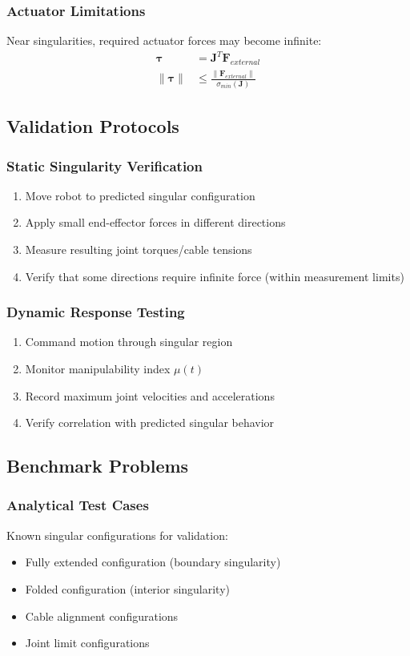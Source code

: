 \documentclass[11pt,a4paper]{article}
\begin{document}
\subsubsection{Actuator Limitations}
Near singularities, required actuator forces may become infinite:
\begin{align}
\bm{\tau} &= \bm{J}^T \bm{F}_{external} \\
\|\bm{\tau}\| &\leq \frac{\|\bm{F}_{external}\|}{\sigma_{min}(\bm{J})}
\end{align}

\subsection{Validation Protocols}

\subsubsection{Static Singularity Verification}
\begin{enumerate}
    \item Move robot to predicted singular configuration
    \item Apply small end-effector forces in different directions  
    \item Measure resulting joint torques/cable tensions
    \item Verify that some directions require infinite force (within measurement limits)
\end{enumerate}

\subsubsection{Dynamic Response Testing}
\begin{enumerate}
    \item Command motion through singular region
    \item Monitor manipulability index $\mu(t)$
    \item Record maximum joint velocities and accelerations
    \item Verify correlation with predicted singular behavior
\end{enumerate}

\subsection{Benchmark Problems}

\subsubsection{Analytical Test Cases}
Known singular configurations for validation:
\begin{itemize}
    \item Fully extended configuration (boundary singularity)
    \item Folded configuration (interior singularity)  
    \item Cable alignment configurations
    \item Joint limit configurations
\end{itemize}
\end{document}
